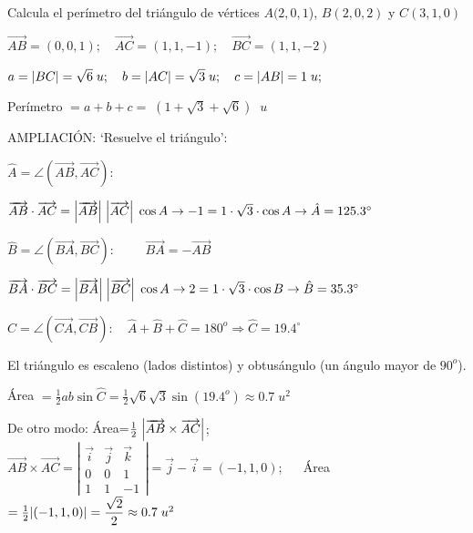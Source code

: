 	
\begin{ejre} Calcula el perímetro del triángulo de vértices $A(2,0,1$), $B(2,0,2)$ y $C(3,1,0)$
\end{ejre}

\begin{proofw}\renewcommand{\qedsymbol}{$\diamond$}	

$\overrightarrow{AB}=(0,0,1);\quad \overrightarrow{AC}=(1,1,-1);\quad \overrightarrow{BC}=(1,1,-2) $

\noindent $a=\abs{BC}=\sqrt{6}\; u;\quad b=\abs{AC}=\sqrt{3}\; u;\quad c=\abs{AB}=1\; u;\quad $

\noindent Perímetro $=a+b+c=\;(1+\sqrt{3}+\sqrt{6})\;\;u$

\noindent AMPLIACIÓN: `Resuelve el triángulo':

\noindent $\hat A=\angle (\overrightarrow{AB},\overrightarrow{AC}):$

\noindent $\overrightarrow{AB} \cdot \overrightarrow{AC}=\abs{ \overrightarrow{AB}} \; \abs{\overrightarrow{AC}}\; \cos A \to -1=1\cdot \sqrt{3}\cdot \cos A \to \hat A=125.3^{\circ}$

\noindent $\hat B=\angle (\overrightarrow{BA},\overrightarrow{BC}): \qquad $ \textcolor{gris}{$\overrightarrow{BA}=-\overrightarrow{AB}$}

\noindent $\overrightarrow{BA} \cdot \overrightarrow{BC}=\abs{ \overrightarrow{BA}} \; \abs{\overrightarrow{BC}}\; \cos A \to 2=1\cdot \sqrt{3}\cdot \cos B \to \hat B=35.3^{\circ}$

\noindent $\hat C=\angle (\overrightarrow{CA},\overrightarrow{CB}):\quad \hat A+\hat B+\hat C=180^o \Rightarrow \hat C=19.4^{\circ}$

\noindent El triángulo es escaleno (lados distintos) y obtusángulo (un ángulo mayor de $90^o$).

\noindent Área $=\frac 1 2 a b \sin \hat C=\frac 1 2 \sqrt{6}\sqrt{3}\sin (19.4^o)\approx 0.7\; u^2$

\noindent \textcolor{gris}{De otro modo: Área=$\frac 1 2 \; \abs{\overrightarrow{AB} \times \overrightarrow{AC}}$}; $\quad$
\noindent\textcolor{gris}{$\overrightarrow{AB} \times \overrightarrow{AC}=\left| \begin{matrix} \vec i&\vec j&\vec k \\ 0&0&1\\1&1&-1 \end{matrix} \right|=\vec j-\vec i=(-1,1,0)$}; $\quad$
\noindent \textcolor{gris}{Área $=\frac 1 2 \abs{(-1,1,0)}=\dfrac { \sqrt{2} } {2} \approx 0.7\; u^2$}

\end{proofw}

